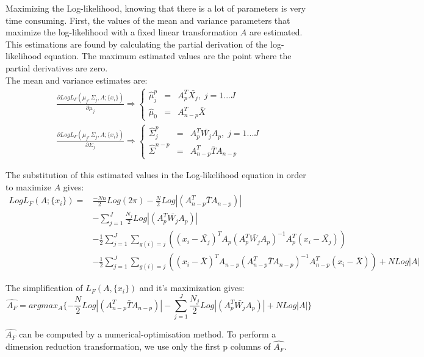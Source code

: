 Maximizing the Log-likelihood, knowing that there is a lot of parameters is very time consuming.
First, the values of the mean and variance parameters that maximize the log-likelihood with a fixed linear transformation $A$ are estimated.
This estimations are found by calculating the partial derivation of the log-likelihood equation. The maximum estimated values are the point where the partial derivatives are zero. \\
The mean and variance estimates are:
$$
\begin{array}{cc}
  \frac{\partial Log L_F(\mu_j, \Sigma_j, A; \{x_i\})}{\partial \mu_j} \Rightarrow \left \{
  \begin{array}{ccc}
    \hat\mu_j^p & = & A_p^T\bar{X_j} ,\; j = 1...J\\
    \hat\mu_0 & = & A_{n - p}^T\bar{X}
  \end{array}
  \right . \\
  \frac{\partial Log L_F(\mu_j, \Sigma_j, A; \{x_i\})}{\partial \Sigma_j} \Rightarrow \left \{
  \begin{array}{ccc}
    \hat\Sigma_j^p & = & A_p^T\bar{W_j}A_p, \; j = 1...J\\
    \hat\Sigma^{n - p} & = & A_{n - p}^T\bar{T}A_{n - p}
  \end{array}
  \right .
\end{array}$$

The substitution of this estimated values in the Log-likelihood equation in order to maximize $A$ gives:
$$
\begin{array}{cl}
  Log L_F(A; \{x_i\}) = & \frac{-N n}{2}Log(2\pi)-\frac{N}{2}Log|(A_{n - p}^T\bar{T}A_{n - p})| \\
  & - \sum\limits_{j = 1}^J
  \frac{N_j}{2}Log|(A_p^T\bar{W_j}A_p)| \\
  & - \frac{1}{2}\sum\limits_{j = 1}^J\sum\limits_{g(i) = j} ((x_i - \bar{X_j})^TA_p(A_p^T\bar{W_j}A_p)^{-1}
  A_p^T(x_i - \bar{X_j})) \\
  & - \frac{1}{2}\sum\limits_{j = 1}^J\sum\limits_{g(i) = j} ((x_i - \bar{X})^TA_{n - p}(A_{n - p}^T\bar{T}A_{n - p})^{-1}
  A_{n - p}^T(x_i - \bar{X})) + N Log|A|
  \end{array}$$

The simplification of $L_F(A, \{x_i\})$ and it's maximization gives:
$$ \hat{A_F} = argmax_A\{-\frac{N}{2}Log|(A_{n - p}^T\bar{T}A_{n - p})| - \sum\limits_{j = 1}^J\frac{N_j}{2}Log|(A_p^T\bar{W_j}A_p)|
+ N Log|A|\}$$

$\hat{A_F}$ can be computed by a numerical-optimisation method.
To perform a dimension reduction transformation, we use only the first p columns of $\hat{A_F}$.

